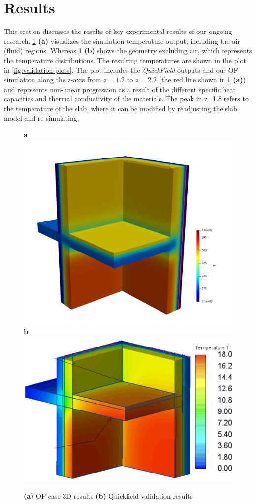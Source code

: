 \section{Results}
This section discusses the results of key experimental results of our ongoing research. 
\cref{paraview} \textbf{(a)} visualizes the simulation temperature output, including the air (fluid) regions. Whereas
\cref{paraview} \textbf{(b)} shows the geometry excluding air, which represents the temperature distributions. The resulting temperatures are shown in the plot in \cref{fig:validation-plots}. The plot includes the \textit{QuickField} outputs and our  \gls{OF} simulation along the z-axis from $z= 1.2$ to $z=2.2$ (the red line shown in \cref{paraview} \textbf{(a)}) and represents non-linear progression as a result of the different specific heat capacities and thermal conductivity of the materials. The peak in z=1.8 refers to the temperature of the slab, where it can be modified by readjusting the slab model and re-simulating. 



\begin{figure}[H]
    \centering
    \textbf{a}\includegraphics[width=0.65\columnwidth]{Figures/casewoutair.png}
    \textbf{b}\includegraphics[width=0.65\columnwidth]{Figures/ValidationCaseClean.png}
\hspace{0.7cm}
    \caption[3D Validation Visualization]{\textbf{(a)} \gls{OF} case 3D results \textbf{(b)} Quickfield validation results}
    \label{paraview}
\end{figure}

